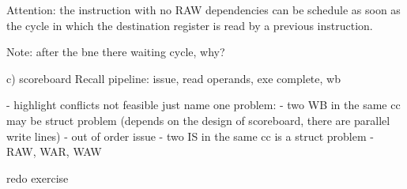 Attention: the instruction with no RAW dependencies can be schedule as soon as the cycle in which the destination register
is read by a previous instruction.

Note: after the bne there waiting cycle, why?


c) scoreboard
Recall pipeline: issue, read operands, exe complete, wb

- highlight conflicts
not feasible just name one problem:
- two WB in the same cc may be struct problem (depends on the design of scoreboard, there are parallel write lines)
- out of order issue
- two IS in the same cc is a struct problem
- RAW, WAR, WAW

redo exercise
